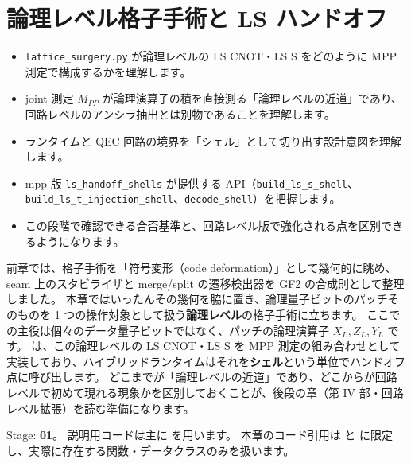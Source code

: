 \chapter{論理レベル格子手術と LS ハンドオフ}\label{ch:ls_logical}

\begin{chaptergoal}
  \begin{itemize}
  \item \texttt{lattice\_surgery.py} が論理レベルの LS CNOT・LS S をどのように MPP 測定で構成するかを理解します。
  \item joint 測定 $M_{PP}$ が論理演算子の積を直接測る「論理レベルの近道」であり、回路レベルのアンシラ抽出とは別物であることを理解します。
  \item ランタイムと QEC 回路の境界を「シェル」として切り出す設計意図を理解します。
  \item mpp 版 \texttt{ls\_handoff\_shells} が提供する API（\texttt{build\_ls\_s\_shell}、\texttt{build\_ls\_t\_injection\_shell}、\texttt{decode\_shell}）を把握します。
  \item この段階で確認できる合否基準と、回路レベル版で強化される点を区別できるようになります。
  \end{itemize}
\end{chaptergoal}

前章では、格子手術を「符号変形（code deformation）」として幾何的に眺め、seam 上のスタビライザと merge/split の遷移検出器を GF2 の合成則として整理しました。
本章ではいったんその幾何を脇に置き、論理量子ビットのパッチそのものを 1 つの操作対象として扱う\textbf{論理レベル}の格子手術に立ちます。
ここでの主役は個々のデータ量子ビットではなく、パッチの論理演算子 $X_L,Z_L,Y_L$ です。
 は、この論理レベルの LS CNOT・LS S を MPP 測定の組み合わせとして実装しており、ハイブリッドランタイムはそれを\textbf{シェル}という単位でハンドオフ点に呼び出します。
どこまでが「論理レベルの近道」であり、どこからが回路レベルで初めて現れる現象かを区別しておくことが、後段の章（第 IV 部・回路レベル拡張）を読む準備になります。

\begin{notebox}
  Stage: \textbf{01}。
  説明用コードは主に  を用います。
  本章のコード引用は  と  に限定し、実際に存在する関数・データクラスのみを扱います。
\end{notebox}

